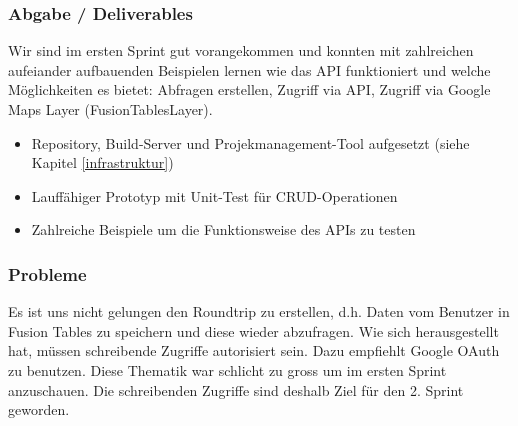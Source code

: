 \subsubsection{Abgabe / Deliverables}
Wir sind im ersten Sprint gut vorangekommen und konnten mit zahlreichen aufeiander aufbauenden Beispielen lernen wie das API funktioniert und welche Möglichkeiten es bietet: Abfragen erstellen, Zugriff via API, Zugriff via Google Maps Layer (FusionTablesLayer).

\begin{itemize}
	\item Repository, Build-Server und Projekmanagement-Tool aufgesetzt (siehe Kapitel \ref{infrastruktur})
	\item Lauffähiger Prototyp mit Unit-Test für CRUD-Operationen
	\item Zahlreiche Beispiele um die Funktionsweise des APIs zu testen
\end{itemize}

\subsubsection{Probleme}
Es ist uns nicht gelungen den Roundtrip zu erstellen, d.h. Daten vom Benutzer in Fusion Tables zu speichern und diese wieder abzufragen. Wie sich herausgestellt hat, müssen schreibende Zugriffe autorisiert sein. Dazu empfiehlt Google OAuth zu benutzen. Diese Thematik war schlicht zu gross um im ersten Sprint anzuschauen. Die schreibenden Zugriffe sind deshalb Ziel für den 2. Sprint geworden. 